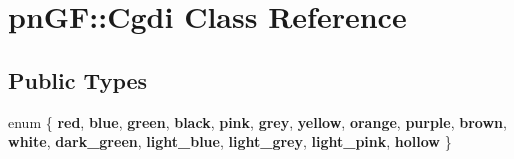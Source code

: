 \section{pn\+GF\+:\+:Cgdi Class Reference}
\label{classpn_g_f_1_1_cgdi}
\subsection*{Public Types}
\begin{DoxyCompactItemize}
\item 
\mbox{\label{classpn_g_f_1_1_cgdi_a7edc878c6586395e16852e6b92ca5590}} 
enum \{ \newline
{\bfseries red}, 
{\bfseries blue}, 
{\bfseries green}, 
{\bfseries black}, 
\newline
{\bfseries pink}, 
{\bfseries grey}, 
{\bfseries yellow}, 
{\bfseries orange}, 
\newline
{\bfseries purple}, 
{\bfseries brown}, 
{\bfseries white}, 
{\bfseries dark\+\_\+green}, 
\newline
{\bfseries light\+\_\+blue}, 
{\bfseries light\+\_\+grey}, 
{\bfseries light\+\_\+pink}, 
{\bfseries hollow}
 \}
\end{DoxyCompactItemize}
